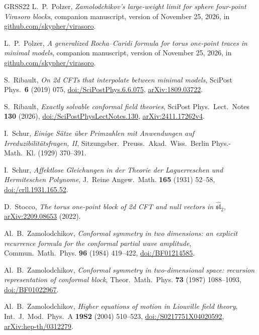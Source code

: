 \documentclass[twoside,10pt]{article}
\numberwithin{equation}{section}
\theoremstyle{slbody}
\theoremstyle{definition}
\theoremstyle{remark}
\begin{document}
{\begin{thebibliography}{GRSS22}
L.~P.~Polzer,
\emph{Zamolodchikov's large-weight limit for sphere four-point Virasoro
blocks},
companion manuscript, version of November 25, 2026, in \href{https://github.com/skypher/virasoro}{github.com/skypher/virasoro}.

L.~P.~Polzer,
\emph{A generalized Rocha--Caridi formula for torus one-point traces in
minimal models},
companion manuscript, version of November 25, 2026, in \href{https://github.com/skypher/virasoro}{github.com/skypher/virasoro}.

S.~Ribault,
\emph{On 2d CFTs that interpolate between minimal models},
SciPost Phys.\ \textbf{6} (2019) 075,
\href{https://doi.org/10.21468/SciPostPhys.6.6.075}%
{doi:/SciPostPhys.6.6.075},
\href{https://arxiv.org/abs/1809.03722}{arXiv:1809.03722}.

S.~Ribault,
\emph{Exactly solvable conformal field theories},
SciPost Phys.\ Lect.\ Notes \textbf{130} (2026),
\href{https://doi.org/10.21468/SciPostPhysLectNotes.130}%
{doi:/SciPostPhysLectNotes.130},
\href{https://arxiv.org/abs/2411.17262v4}{arXiv:2411.17262v4}.

I.~Schur,
\emph{Einige S\"atze \"uber Primzahlen mit Anwendungen auf Irreduzibilit\"atsfragen, II},
Sitzungsber.\ Preuss.\ Akad.\ Wiss.\ Berlin Phys.-Math.\ Kl. (1929) 370--391.

I.~Schur,
\emph{Affektlose Gleichungen in der Theorie der Laguerreschen und Hermiteschen Polynome},
J.\ Reine Angew.\ Math. \textbf{165} (1931) 52--58,
\href{https://doi.org/10.1515/crll.1931.165.52}{doi:/crll.1931.165.52}.

D.~Stocco,
\emph{The torus one-point block of 2d CFT and null vectors in
\(\widehat{\mathfrak{sl}}_2\)},
\href{https://arxiv.org/abs/2209.08653}{arXiv:2209.08653} (2022).

Al.~B.~Zamolodchikov,
\emph{Conformal symmetry in two dimensions: an explicit recurrence
formula for the conformal partial wave amplitude},
Commun.\ Math.\ Phys. \textbf{96} (1984) 419--422,
\href{https://doi.org/10.1007/BF01214585}{doi:/BF01214585}.

Al.~B.~Zamolodchikov,
\emph{Conformal symmetry in two-dimensional space: recursion
representation of conformal block},
Theor.\ Math.\ Phys. \textbf{73} (1987) 1088--1093,
\href{https://doi.org/10.1007/BF01022967}{doi:/BF01022967}.

Al.~B.~Zamolodchikov,
\emph{Higher equations of motion in Liouville field theory},
Int.\ J.\ Mod.\ Phys.\ A \textbf{19S2} (2004) 510--523,
\href{https://doi.org/10.1142/S0217751X04020592}{doi:/S0217751X04020592},
\href{https://arxiv.org/abs/hep-th/0312279}{arXiv:hep-th/0312279}.
\end{thebibliography}
}
\end{document}
